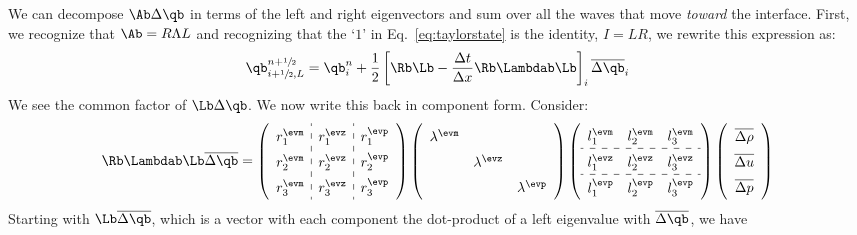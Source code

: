 We can decompose $\Ab \Delta \qb$ in terms of the left and right
eigenvectors and sum over all the waves that move {\em toward} the
interface.  First, we recognize that $\Ab = R \Lambda L$ and recognizing
that the `$1$'
in Eq.~\ref{eq:taylorstate} is the identity, $I = LR$, we rewrite this
expression as:
\begin{equation}
\qb_{i+\myhalf,L}^{n+\myhalf} = \qb_i^n +
     \frac{1}{2} \left [ \Rb\Lb - \frac{\Delta t}{\Delta x} \Rb\Lambdab \Lb \right ]_i \overline{\Delta \qb}_i
\end{equation}
We see the common factor of $\Lb \Delta \qb$.  We now write this back in
component form.  Consider:
\begin{equation}
\renewcommand{\arraystretch}{1.5}
\Rb\Lambdab \Lb \overline{\Delta \qb} =
   \left ( \begin{array}{c:c:c}
             r_1^\evm & r_1^\evz & r_1^\evp \\
             r_2^\evm & r_2^\evz & r_2^\evp \\
             r_3^\evm & r_3^\evz & r_3^\evp \end{array} \right )
   \left ( \begin{array}{ccc}
             \lambda^\evm &              & \\
                          & \lambda^\evz & \\
                          &              & \lambda^\evp \end{array} \right )
   \left ( \begin{array}{ccc}
             l_1^\evm & l_2^\evm & l_3^\evm \\
             \hdashline
             l_1^\evz & l_2^\evz & l_3^\evz \\
             \hdashline
             l_1^\evp & l_2^\evp & l_3^\evp \end{array} \right )
   \left ( \begin{array}{c}
            \overline{\Delta \rho} \\
            \overline{\Delta u} \\
            \overline{\Delta p} \end{array} \right )
\renewcommand{\arraystretch}{1.0}
\end{equation}
Starting with $\Lb \overline{\Delta \qb}$, which is a vector with each component
the dot-product of a left eigenvalue with $\overline{\Delta \qb}$, we have
